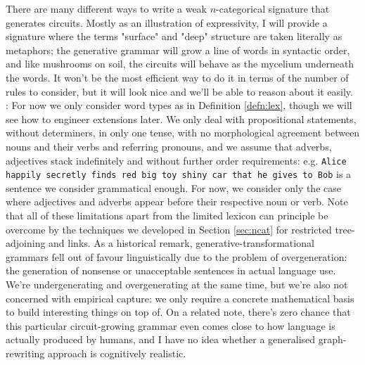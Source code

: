 There are many different ways to write a weak $n$-categorical signature that generates circuits. Mostly as an illustration of expressivity, I will provide a signature where the terms "surface" and "deep" structure are taken literally as metaphors; the generative grammar will grow a line of words in syntactic order, and like mushrooms on soil, the circuits will behave as the mycelium underneath the words. It won't be the most efficient way to do it in terms of the number of rules to consider, but it will look nice and we'll be able to reason about it easily.\\

: For now we only consider word types as in Definition \ref{defn:lex}, though we will see how to engineer extensions later. We only deal with propositional statements, without determiners, in only one tense, with no morphological agreement between nouns and their verbs and referring pronouns, and we assume that adverbs, adjectives stack indefinitely and without further order requirements: e.g. \texttt{Alice happily secretly finds red big toy shiny car that he gives to Bob} is a sentence we consider grammatical enough. For now, we consider only the case where adjectives and adverbs appear before their respective noun or verb. Note that all of these limitations apart from the limited lexicon can principle be overcome by the techniques we developed in Section \ref{sec:ncat} for restricted tree-adjoining and links. As a historical remark, generative-transformational grammars fell out of favour linguistically due to the problem of overgeneration: the generation of nonsense or unacceptable sentences in actual language use. We're undergenerating and overgenerating at the same time, but we're also not concerned with empirical capture: we only require a concrete mathematical basis to build interesting things on top of. On a related note, there's zero chance that this particular circuit-growing grammar even comes close to how language is actually produced by humans, and I have no idea whether a generalised graph-rewriting approach is cognitively realistic.

